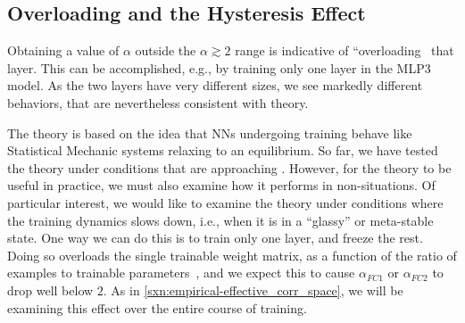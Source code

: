 
\subsection{Overloading and the Hysteresis Effect}
\label{sxn:hysteresis_effect}
Obtaining a value of $\alpha$ outside the $\alpha \gtrsim 2$ range is indicative of ``overloading~\cite{SST92} that layer. 
This can be accomplished, e.g., by training only one layer in the MLP3 model.
As the two layers have very different sizes, we see markedly different behaviors, that are nevertheless consistent with theory.

The \SETOL theory is based on the idea that NNs undergoing training behave like Statistical Mechanic systems relaxing to an equilibrium. 
So far, we have tested the theory under conditions that are approaching \Ideal. 
However, for the theory to be useful in practice, we must also examine how it performs in non-\Ideal situations. 
Of particular interest, we would like to examine the theory under conditions where the training dynamics slows down, i.e., when it is in a ``glassy''
or meta-stable state. 
One way we can do this is to train only one layer, and freeze the rest. 
Doing so overloads the single trainable weight matrix, as a function of the ratio of examples to trainable
parameters~\cite{SST92,Gardner_1988,MM17_TR}, and we expect this to cause $\alpha_{FC1}$ or $\alpha_{FC2}$ to drop well below $2$. As in \ref{sxn:empirical-effective_corr_space}, we will be examining this effect over the entire course of training.

